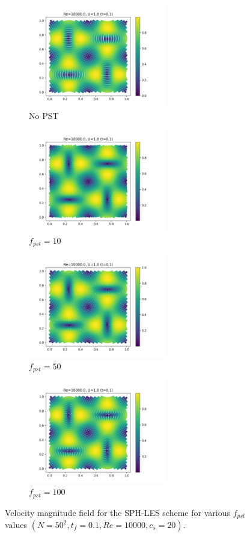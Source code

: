 \begin{figure}[htbp!]
  \begin{subfigure}{7cm}
    \centering\includegraphics[width=6cm]{Code-Figures/okra2022/pst/c0_20_tait_pec_dtmul_1_nx_50_pst_-1_re_10000_ok2022/final_vmag.png}
    \caption{No PST}
  \end{subfigure}
  \begin{subfigure}{7cm}
    \centering\includegraphics[width=6cm]{Code-Figures/okra2022/pst/c0_20_tait_pec_dtmul_1_nx_50_pst_10_re_10000_ok2022/final_vmag.png}
    \caption{$f_{pst} = 10$}
  \end{subfigure}
  \begin{subfigure}{7cm}
    \centering\includegraphics[width=6cm]{Code-Figures/okra2022/pst/c0_20_tait_pec_dtmul_1_nx_50_pst_50_re_10000_ok2022/final_vmag.png}
    \caption{$f_{pst} = 50$}
  \end{subfigure}
  \begin{subfigure}{7cm}
    \centering\includegraphics[width=6cm]{Code-Figures/okra2022/pst/c0_20_tait_pec_dtmul_1_nx_50_pst_100_re_10000_ok2022/final_vmag.png}
    \caption{$f_{pst} = 100$}
  \end{subfigure}
  \caption{Velocity magnitude field for the SPH-LES scheme for various $f_{pst}$ values $(N=50^2, t_f=0.1, Re=10000, c_s=20)$.}
  \label{fig:okra2022-pst-vmag}
\end{figure}

